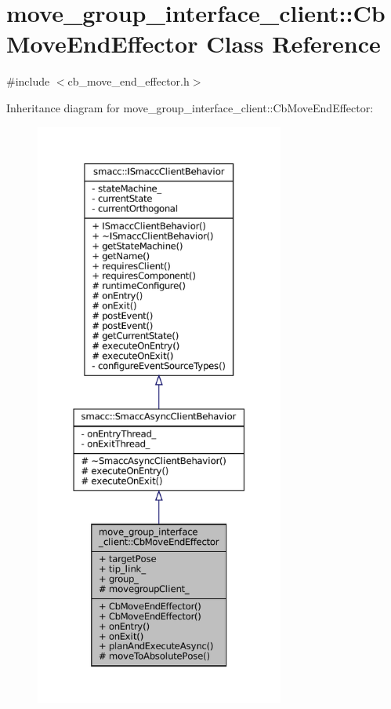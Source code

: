 \hypertarget{classmove__group__interface__client_1_1CbMoveEndEffector}{}\section{move\+\_\+group\+\_\+interface\+\_\+client\+:\+:Cb\+Move\+End\+Effector Class Reference}
\label{classmove__group__interface__client_1_1CbMoveEndEffector}


{\ttfamily \#include $<$cb\+\_\+move\+\_\+end\+\_\+effector.\+h$>$}



Inheritance diagram for move\+\_\+group\+\_\+interface\+\_\+client\+:\+:Cb\+Move\+End\+Effector\+:
\nopagebreak
\begin{figure}[H]
\begin{center}
\leavevmode
\includegraphics[height=550pt]{classmove__group__interface__client_1_1CbMoveEndEffector__inherit__graph}
\end{center}
\end{figure}



